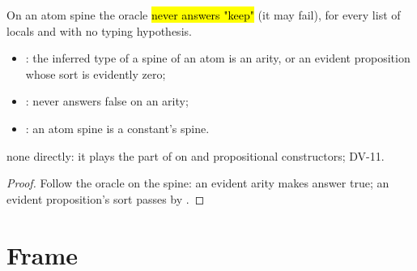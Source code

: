 \begin{lemma}
  \label{lem:EraseProof-Pure-isErasable_atom}
  \leanok
   On an atom spine the oracle \hl{never answers "keep"} (it may fail), for every
  list of locals and with no typing hypothesis.
  \begin{itemize}
  \item {}: the inferred type of a spine of an atom is an arity, or an
        evident proposition whose sort is evidently zero;
  \item {}:  never answers false on an arity;
  \item {}: an atom spine is a constant's spine.
  \end{itemize}
   none directly: it plays the part of  on  and
  propositional constructors; DV-11.
\end{lemma}
\begin{proof}
  \leanok
   Follow the oracle on the spine: an evident arity makes  answer true;
  an evident proposition's sort passes  by .
\end{proof}

\section{Frame}\label{sec:oracle-frame}

